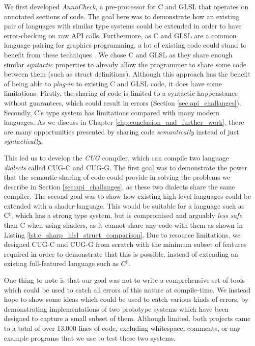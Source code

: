 \documentclass[a4paper,12pt,twoside,openright]{report}
\begin{document}
We first developed \textit{AnnoCheck}, a pre-processor for C and GLSL that
operates on annotated sections of code. The goal here was to demonstrate how an
existing pair of languages with similar type systems could be extended in order
to have error-checking on raw API calls. Furthermore, as C and GLSL are a
common language pairing for graphics programming, a lot of existing code could
stand to benefit from these techniques \cite{ListOfOpenGLGames}. We chose C and
GLSL as they share enough similar \textit{syntactic} properties to already
allow the programmer to share some code between them (such as struct
definitions). Although this approach has the benefit of being able to
\textit{plug-in} to existing C and GLSL code, it does have some limitations.
Firstly, the sharing of code is limited to a syntactic happenstance without
guarantees, which could result in errors (Section \ref{sec:api_challanges}).
Secondly, C's type system has limitations compared with many modern languages.
As we discuss in Chapter \ref{chp:conclusion_and_further_work}, there are many
opportunities presented by sharing code \textit{semantically} instead of just
\textit{syntactically}.

This led us to develop the \textit{CUG} compiler, which can compile two
language \textit{dialects} called CUG-C and CUG-G. The first goal was to
demonstrate the power that the semantic sharing of code could provide in
solving the problems we describe in Section \ref{sec:api_challanges}, as these
two dialects share the same compiler. The second goal was to show how existing
high-level languages could be extended with a shader-language. This would be
suitable for a language such as C$^\sharp$, which has a strong type system, but
is compromised and arguably \textit{less safe} than C when using shaders, as it
cannot share any code with them as shown in Listing
\ref{lst:c_sharp_hlsl_struct_comparison}. Due to resource limitations, we
designed CUG-C and CUG-G from scratch with the minimum subset of features
required in order to demonstrate that this is possible, instead of extending an
existing full-featured language such as $C^\sharp$.

One thing to note is that our goal was not to write a comprehensive set of
tools which could be used to catch all errors of this nature at compile-time.
We instead hope to show some ideas which could be used to catch various kinds
of errors, by demonstrating implementations of two prototype systems which have
been designed to capture a small subset of them. Although limited, both
projects came to a total of over 13,000 lines of code, excluding whitespace,
comments, or any example programs that we use to test these two systems.
\end{document}
